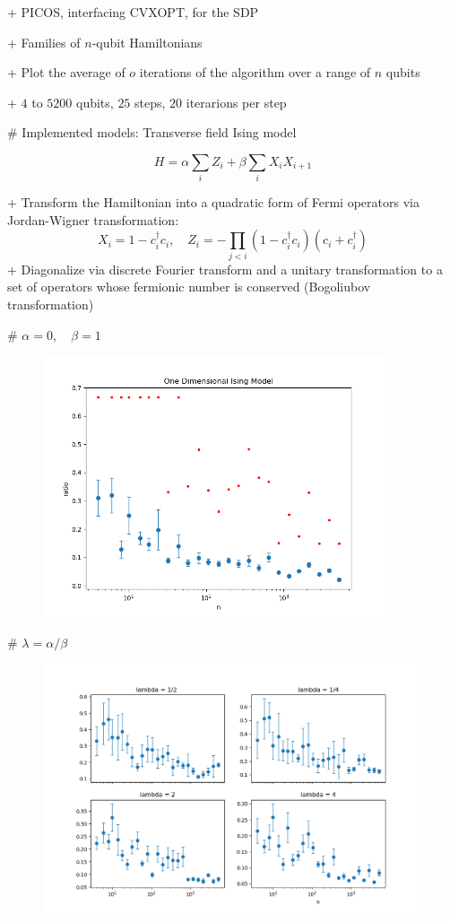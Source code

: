 + PICOS, interfacing CVXOPT, for the SDP

+ Families of $n$-qubit Hamiltonians

+ Plot the average of $o$ iterations of the algorithm over a range of $n$ qubits

+ $4$ to $5200$ qubits, $25$ steps, $20$ iterarions per step


# Implemented models: Transverse field Ising model

$$H=\alpha \sum_{i} Z_i + \beta \sum_{i} X_iX_{i+1}$$

+ Transform the Hamiltonian into a quadratic form of Fermi operators via Jordan-Wigner transformation: $$X_i = 1-c^{\dagger}_ic_i,\quad Z_i= -\prod_{j<i}(1-c^{\dagger}_ic_i)(c_i+c^{\dagger}_i) $$
+ Diagonalize via discrete Fourier transform and a unitary transformation to a set of operators whose fermionic number is conserved (Bogoliubov transformation)

# $\alpha = 0,\quad \beta = 1$

\begin{figure}[H]
	\centering
	\includegraphics[width=0.9\textwidth]{avgchainplot(4,5200,2,20,25)}
	\label{fig:1}
\end{figure}

# $\lambda=\alpha/\beta$

\begin{figure}[H]
	\centering
	\includegraphics[width=1.1\textwidth]{tfiplots}
	\label{fig:2}
\end{figure}

